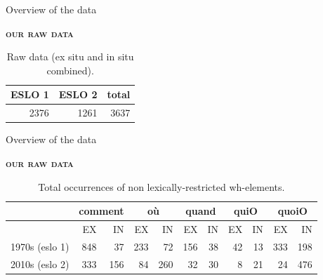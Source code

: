 \documentclass[lesson_slides]{subfiles}
\begin{document}
\begin{frame}[c]{Overview of the data}

\textbf{\textsc{our raw data}}

\begin{table}[H]
    \centering
    \small
    \begin{adjustbox}
        \begin{tabular}{r|r|r}
        ESLO 1  & ESLO 2 & total \\
        \hline
        2376 & 1261 & 3637 \\
        \hline
        \end{tabular}
    \end{adjustbox}
\caption{\label{tab:samp3}Raw data (ex situ and in situ combined).}
\end{table}
  
\end{frame}
\begin{frame}[c]{Overview of the data}

\textbf{\textsc{our raw data}}

\begin{table}[H]
    \centering
    \small
    \begin{adjustbox}
        \begin{tabular}{l|rr|rr|rr|rr|rr}
        {} & \multicolumn{2}{c}{comment}  & \multicolumn{2}{c}{où} & \multicolumn{2}{c}{quand} & \multicolumn{2}{c}{quiO}& \multicolumn{2}{c}{quoiO}\\
        \hline
        {} & EX & IN & EX & IN & EX & IN & EX & IN & EX & IN\\
        1970s (eslo 1) & 848 & 37 & 233 & 72 & 156 & 38 & 42 & 13 & 333 & 198\\
        2010s (eslo 2) & 333 & 156 & 84 & 260 & 32 & 30 & 8 & 21 & 24 & 476 \\
        \hline
        \end{tabular}
    \end{adjustbox}
\caption{\label{tab:samp3}Total occurrences of non lexically-restricted wh-elements.}
\end{table}
  
\end{frame}
\end{document}
